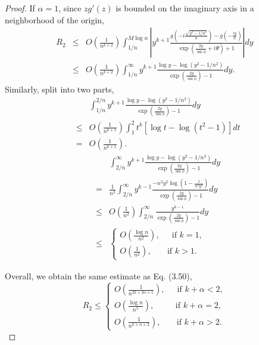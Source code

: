 \documentclass[11pt]{article}
\begin{document}
\begin{proof}
If $\alpha=1$, since $z g'(z)$ is bounded on the imaginary axis in a neighborhood of the origin,
\begin{eqnarray}
    R_2& \leq &O(\frac{1}{ n^{k+2}})\int_{1/n}^{M\log n}  \left|y^{k+1}\frac{  g(-i\frac{\sqrt{y^2-1/n^2}}{n}) - g(-\frac{iy}{n})}{\exp\left(\frac{2y}{\sin\phi}+i\Psi\right) + 1} \right|dy \\
    &\leq & O(\frac{1}{ n^{k+2}})\int_{1/n}^{\infty}  y^{k+1}\frac{  \log y - \log(y^2-1/n^2) }{\exp\left(\frac{2y}{\sin\phi}\right) - 1} dy.
\end{eqnarray}
Similarly, split into two parts,
\begin{eqnarray}
    &&\int_{1/n}^{2/n}  y^{k+1}\frac{  \log y - \log(y^2-1/n^2) }{\exp\left(\frac{2y}{\sin\phi}\right) - 1} dy \nonumber \\
    &\leq & O(\frac{1}{ n^{k+1}})\int_{1}^{2}  t^{k} \left[\log t - \log(t^2-1) \right] dt\\
    &=& O(\frac{1}{ n^{k+1}}).
\end{eqnarray}
\begin{eqnarray}
    &&\int_{2/n}^{\infty}  y^{k+1}\frac{  \log y - \log(y^2-1/n^2) }{\exp\left(\frac{2y}{\sin\phi}\right) - 1} dy \nonumber \\
    &= & \frac{1}{ n^{2}}\int_{2/n}^{\infty}  y^{k-1}\frac{  -n^2 y^2 \log (1-\frac{1}{n^2y^2}) }{\exp\left(\frac{2y}{\sin\phi}\right) - 1} dy \\
    &\leq & O(\frac{1}{ n^{2}})\int_{2/n}^{\infty}  \frac{  y^{k-1}}{\exp\left(\frac{2y}{\sin\phi}\right) - 1} dy\\
    &\leq& \begin{cases}
        O(\frac{\log n}{n^{2}}), \ \ \ \ \  \text{ if } k=1,\\
        O(\frac{1}{n^{2}}),\ \ \ \ \ \ \  \text{ if }  k>1.
    \end{cases}
\end{eqnarray}

Overall, we obtain the same estimate as Eq. (3.50),
\begin{equation}
    R_2 \leq \begin{cases}
        O(\frac{1}{n^{2k+2\alpha+1}}), \ \ \ \ \  \text{ if } k+\alpha < 2,\\
        O(\frac{\log n}{n^{5}}), \ \ \ \ \ \ \ \ \ \  \text{ if } k+\alpha = 2,\\
        O(\frac{1}{n^{k+\alpha+2}}),\ \ \ \ \ \ \  \text{ if }  k+\alpha > 2.
    \end{cases}
\end{equation}
\end{proof}




\end{document}
